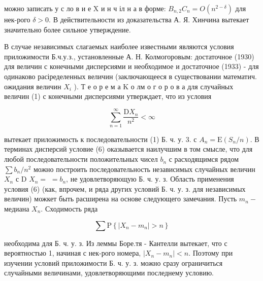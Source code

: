\documentclass[10pt]{article}
\begin{document}
можно записать у с ло в и е $\mathrm{X}$ и н ч іл н а в форме: $B_{n, 2} C_{n}=O\left(n^{2-\delta}\right)$ для нек-рого $\delta>0$. В действительности из доказательства А. Я. Хинчина вытекает значительно более сильное утверждение.



В случае независимых слагаемых наиболее известными являются условия приложимости Б.ч.у.з., установленные А. Н. Колмогоровым: достаточное (1930) для величин с конечными дисперсиями и необходимое и достаточное (1933) - для одинаково расіределенных величин (заключающееся в существовании математич. ожидания величин $X_{i}$ ). Т е о р е м а $\mathrm{K}$ о лм о г о р о в а для случайных величин (1) с конечными дисперсиями утверждает, что из условия



\[

\sum_{n=1}^{\infty} \frac{\mathrm{D} X_{n}}{n^{2}}<\infty

\]



вытекает приложимость к последовательности (1) Б. ч. у. 3. с $A_{n}=\mathrm{E}\left(S_{n} / n\right)$. В терминах дисперсий условие (6) оказывается наилучшим в том смысле, что для любой последовательности положительных чисел $b_{n}$ с расходящимся рядом $\sum b_{n} / n^{2}$ можно построить последовательность независимых случайных величин $X_{n}$ с D $X_{n}=$ $=b_{n}$, не удовлетворяющую Б. ч. у. з. Область применения условия (6) (как, впрочем, и ряда других условий Б. ч. у. з. для независимых величин) можкет быть расширена на основе следующего замечания. Пусть $m_{n}-$ медиана $X_{n}$. Сходимость ряда



\[

\sum \mathrm{P}\left\{\left|X_{n}-m_{n}\right|>n\right\}

\]



необходима для Б. ч. у. з. Из леммы Боре.тя - Кантелли вытекает, что с вероятностью 1, начиная с нек-рого номера, $\left|X_{n}-m_{n}\right|<n$. Поэтому при изучении условий приложимости Б. ч. у. з. можно сразу ограничиться случайными величинами, удовлетворяющими последнему условию.
\end{document}
